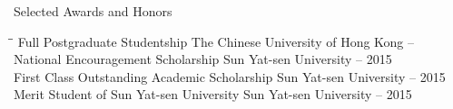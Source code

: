 
\begin{rSection}{Selected Awards and Honors}
\begin{tabbing}
\hspace{3.2in}\= \hspace{2.8in}\= \kill
    Full Postgraduate Studentship                \>The Chinese University of Hong Kong                       --      \\
    National Encouragement Scholarship      \> Sun Yat-sen University      -- 2015 \\
    First Class Outstanding Academic Scholarship             \> Sun Yat-sen University      -- 2015 \\
    Merit Student of Sun Yat-sen University                   \> Sun Yat-sen University      -- 2015
\end{tabbing}
\end{rSection}

